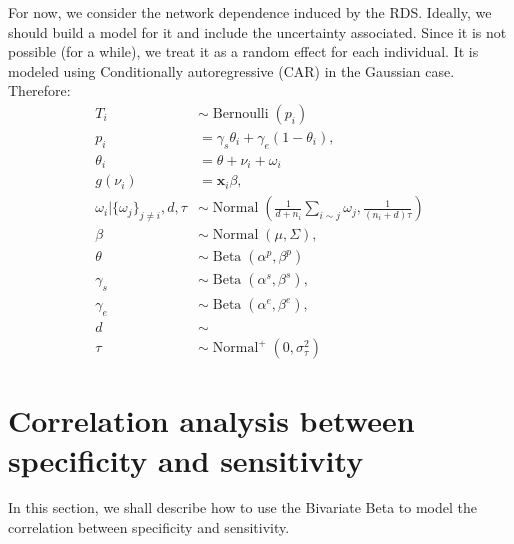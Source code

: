 \documentclass[a4paper, notitlepage, 11pt]{article}
\newcommand{\x}{\boldsymbol{x}}
\newcommand{\N}{\operatorname{Normal}}
\newcommand{\betadist}{\operatorname{Beta}}
\theoremstyle{definition}
\theoremstyle{remark}
\begin{document}
For now, we consider the network dependence induced by the RDS. Ideally, we 
should build a model for it and include the uncertainty associated.
Since it is not possible (for a while), we treat it as a random effect for
each individual. It is modeled using Conditionally autoregressive (CAR) in the
Gaussian case. Therefore: 
\begin{equation}
  \begin{aligned}
    T_i &\sim \operatorname{Bernoulli}(p_i) \\
    p_i &= \gamma_s\theta_i + \gamma_e(1 - \theta_i),  \\
    \theta_i &= \theta + \nu_i + \omega_i \\
    g(\nu_i) &= \x_i\beta,  \\
    \omega_i|\{\omega_j\}_{j\neq i}, d, \tau &\sim \N\left(\frac{1}{d+n_i}\sum_{i \sim j} \omega_j, \frac{1}{(n_i + d)\tau}\right) \\
    \beta &\sim \N(\mu, \Sigma), \\ 
    \theta &\sim \betadist(\alpha^p, \beta^p) \\
    \gamma_s &\sim \betadist(\alpha^s, \beta^s), \\
    \gamma_e &\sim \betadist(\alpha^e, \beta^e), \\  
    d &\sim \\
    \tau &\sim \N^+(0,\sigma^2_{\tau})  
  \end{aligned}  
\end{equation}


\section{Correlation analysis between specificity and sensitivity}

In this section, we shall describe how to use the Bivariate Beta
\cite{olkin2015constructions} to model the correlation between specificity and
sensitivity.

 
\end{document}

